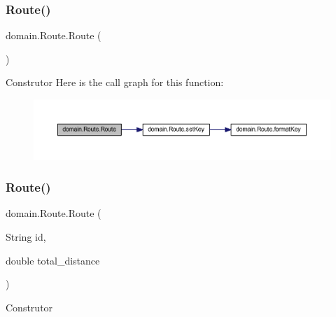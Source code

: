 \subsubsection{\texorpdfstring{Route()}{Route()}\hspace{0.1cm}{\footnotesize\ttfamily [1/3]}}
{\footnotesize\ttfamily domain.\+Route.\+Route (\begin{DoxyParamCaption}{ }\end{DoxyParamCaption})}

Construtor Here is the call graph for this function\+:\nopagebreak
\begin{figure}[H]
\begin{center}
\leavevmode
\includegraphics[width=350pt]{classdomain_1_1_route_a7e62f0d946cbba216309d1c603346578_cgraph}
\end{center}
\end{figure}
\mbox{\label{classdomain_1_1_route_a18a40dd809d38f62057c29212b3e2e76}} 
\subsubsection{\texorpdfstring{Route()}{Route()}\hspace{0.1cm}{\footnotesize\ttfamily [2/3]}}
{\footnotesize\ttfamily domain.\+Route.\+Route (\begin{DoxyParamCaption}\item[{String}]{id,  }\item[{double}]{total\+\_\+distance }\end{DoxyParamCaption})}

Construtor


